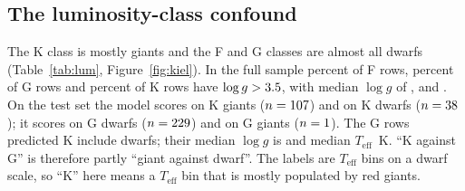 \documentclass[11pt,a4paper]{article}
\newcommand{\Teff}{$T_{\mathrm{eff}}$\xspace}
\newcommand{\dA}{\Delta A}
\begin{document}
\begin{table}[ht]
\centering
\caption{K-class $\dA_K$ (rows lost/gained in brackets) for each line set under the 2 $\times$ 2 design: production or polynomial\_n5 continuum, each with interpolation (primary) or constant fill. The constant fill is the median of the training matrix outside the gap under the same continuum (\ablFillTrainProd{} for production, \ablFillTrainPoly{} for polynomial\_n5).}
\label{tab:ablation-k}
\small
\resizebox{\textwidth}{!}{}
\end{table}

\begin{table}[ht]
\centering
\caption{K-class positive control: $\dA_K$ for the joint mask of all five line sets and for the 20, 50 and 100 bins with the largest validation-set mean $|$SHAP$|$ for class K, under the interpolation and constant fills (production continuum, class-matched null of \pcNControls{} bin-matched windows, \pcNBoot{} bootstrap resamples). ``Upper bound'' is the one-sided exact 95 percent Clopper--Pearson bound on the loss rate. The SHAP-ranked sets are post hoc; \pcOverlapTopHundred{} of the 100 bins lie inside the catalogued windows.}
\label{tab:kcontrol}
\small
\resizebox{\textwidth}{!}{}
\end{table}

\subsection{The luminosity-class confound}
\label{subsec:lum}

The K class is mostly giants and the F and G classes are almost all dwarfs (Table~\ref{tab:lum}, Figure~\ref{fig:kiel}). In the full sample \lumDwarfPctF{} percent of F rows, \lumDwarfPctG{} percent of G rows and \lumDwarfPctK{} percent of K rows have $\log g > 3.5$, with median $\log g$ of \lumLoggF, \lumLoggG{} and \lumLoggK. On the test set the model scores \lumAccKGiant{} on K giants ($n = 107$) and \lumAccKDwarf{} on K dwarfs ($n = 38$); it scores \lumAccGDwarf{} on G dwarfs ($n = 229$) and \lumAccGGiant{} on G giants ($n = 1$). The \gkErrN{} G rows predicted K include \gkErrDwarf{} dwarfs; their median $\log g$ is \gkErrLogg{} and median \Teff \gkErrTeff~K. ``K against G'' is therefore partly ``giant against dwarf''. The labels are \Teff bins on a dwarf scale, so ``K'' here means a \Teff bin that is mostly populated by red giants.
\end{document}
